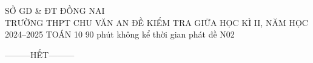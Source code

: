 \ExamMode
\ExamInfo
    {SỞ GD \& ĐT ĐỒNG NAI\\TRƯỜNG THPT CHU VĂN AN}
    {ĐỀ KIỂM TRA GIỮA HỌC KÌ II, NĂM HỌC 2024--2025}
    {TOÁN 10}
    {90 phút}
    {không kể thời gian phát đề}
    {N02}
\ShowHeaderQR

\MakeExamHeader





\begin{center}
---------HẾT---------
\end{center}
